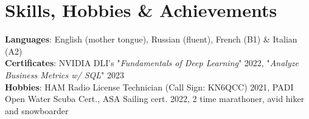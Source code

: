 \documentclass[letterpaper,11pt]{article}
\begin{document}
%



\section{Skills, Hobbies \& Achievements}
 \begin{itemize}[leftmargin=0.15in, label={}]
    \small{\item{
     \textbf{Languages}{: English (mother tongue), Russian (fluent), French (B1) \& Italian (A2)} \\
     \textbf{Certificates}{: NVIDIA DLI's "\textit{Fundamentals of Deep Learning}" 2022, "\textit{Analyze Business Metrics w/ SQL}" 2023} \\
     \textbf{Hobbies}{: HAM Radio License Technician (Call Sign: KN6QCC) 2021, PADI Open Water Scuba Cert., ASA Sailing cert. 2022, 2 time marathoner, avid hiker and snowboarder}
    }}
 \end{itemize}


\end{document}
